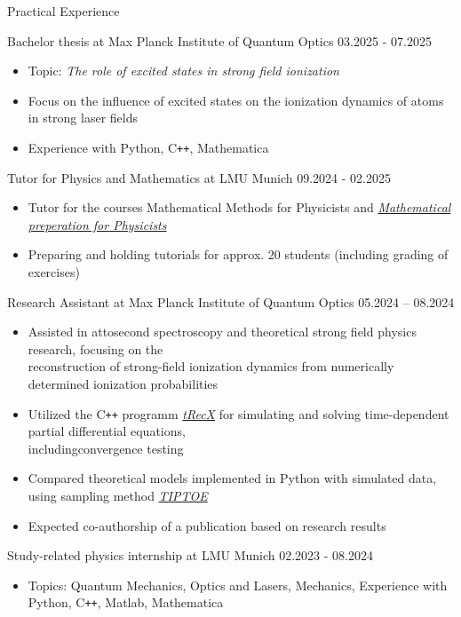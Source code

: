 \documentclass{resume}
\begin{document}
\begin{rSection}{Practical Experience}

    Bachelor thesis at Max Planck Institute of Quantum Optics \hfill 03.2025 - 07.2025
    \begin{itemize}\footnotesize
        \item Topic: \textit{The role of excited states in strong field ionization}
        \item Focus on the influence of excited states on the ionization dynamics of atoms in strong laser fields
        \item Experience with Python, C\texttt{++}, Mathematica
    \end{itemize}

    Tutor for Physics and Mathematics at LMU Munich \hfill 09.2024 - 02.2025
    \begin{itemize}\footnotesize
        \item Tutor for the courses Mathematical Methods for Physicists and \textit{\href{https://www.physik.lmu.de/de/studium/zusatzangebote/mathe-crashkurs/}{Mathematical preperation for Physicists}}
        \item Preparing and holding tutorials for approx. 20 students (including grading of exercises)
    \end{itemize}

    Research Assistant at Max Planck Institute of Quantum Optics \hfill 05.2024 – 08.2024
    \begin{itemize}\footnotesize
        \item Assisted in attosecond spectroscopy and theoretical strong field physics research, focusing on the\\reconstruction of strong-field ionization dynamics from numerically determined ionization probabilities
        \item Utilized the C\texttt{++} programm \textit{\href{https://gitlab.physik.uni-muenchen.de/AG-Scrinzi/tRecX}{tRecX}} for simulating and solving time-dependent partial differential equations,\\includingconvergence testing
        \item Compared theoretical models implemented in Python with simulated data, using sampling method \textit{\href{https://doi.org/10.1364/OPTICA.5.000402}{TIPTOE}}
        \item Expected co-authorship of a publication based on research results
    \end{itemize}

    Study-related physics internship at LMU Munich \hfill 02.2023 - 08.2024
    \begin{itemize}\footnotesize
        \item Topics: Quantum Mechanics, Optics and Lasers, Mechanics, Experience with Python, C\texttt{++}, Matlab, Mathematica
    \end{itemize}

\end{rSection}
\end{document}
